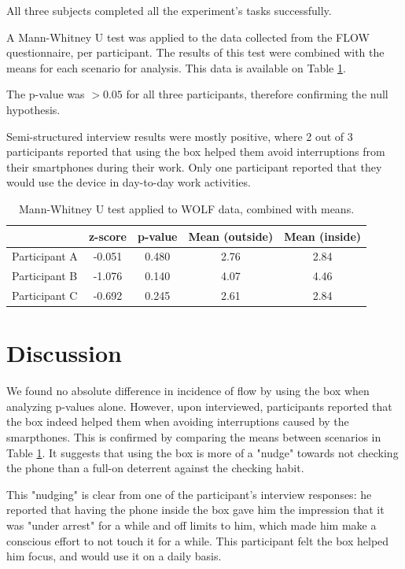 \documentclass[format=acmsmall]{acmart}
\begin{document}
All three subjects completed all the experiment's tasks successfully.

A Mann-Whitney U test was applied to the data collected from the FLOW questionnaire, per participant. The results of this test were combined with the means for each scenario for analysis. This data is available on Table \ref{tab:results}. 

The p-value was $>0.05$ for all three participants, therefore confirming the null hypothesis.

Semi-structured interview results were mostly positive, where 2 out of 3 participants reported that using the box helped them avoid interruptions from their smartphones during their work. Only one participant reported that they would use the device in day-to-day work activities.

\begin{table}[ht]
\centering
\begin{tabular}{|l||cc||cc|}
\hline
 & z-score & p-value & Mean (outside) & Mean (inside) \\ \hline
Participant A & -0.051 & 0.480 & 2.76 & 2.84 \\
Participant B & -1.076 & 0.140 & 4.07 & 4.46 \\
Participant C & -0.692 & 0.245 & 2.61 & 2.84 \\ \hline
\end{tabular}
\caption{Mann-Whitney U test applied to WOLF data, combined with means.}
\label{tab:results}
\end{table}

\section{Discussion}

We found no absolute difference in incidence of flow by using the box when analyzing p-values alone. However, upon interviewed, participants reported that the box indeed helped them when avoiding interruptions caused by the smarpthones. This is confirmed by comparing the means between scenarios in Table \ref{tab:results}. It suggests that using the box is more of a "nudge" towards not checking the phone than a full-on deterrent against the checking habit.

This "nudging" is clear from one of the participant's interview responses: he reported that having the phone inside the box gave him the impression that it was "under arrest" for a while and off limits to him, which made him make a conscious effort to not touch it for a while. This participant felt the box helped him focus, and would use it on a daily basis.
\end{document}
